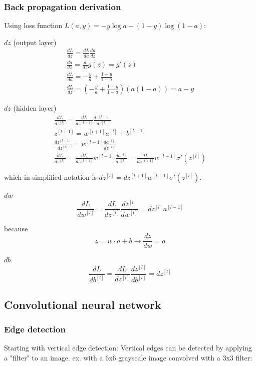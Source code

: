 \documentclass[12pt]{article}
\begin{document}
\subsubsection{Back propagation derivation}

Using loss function $L(a,y) = -y\log a - (1-y)\log (1-a)$:

$dz$ (output layer)
\begin{gather*}
    \frac{dL}{dz} = \frac{dL}{da} \frac{da}{dz}\\
    \frac{da}{dz} = \frac{d}{dz} g(z) = g'(z)\\
    \frac{dL}{da} = -\frac{y}{a} + \frac{1-y}{1-a}\\
    \frac{dL}{dz} = \left(-\frac{y}{a} + \frac{1-y}{1-a}\right)\left(a(1-a)\right) = a - y
\end{gather*}

$dz$ (hidden layer)
\begin{gather*}
    \frac{dL}{dz^{[l]}} = \frac{dL}{dz^{[l+1]}} \frac{dz^{[l+1]}}{dz^{[l]}}\\
    z^{[l+1]} = w^{[l+1]}a^{[l]} + b^{[l+1]}\\
    \frac{dz^{[l+1]}}{dz^{[l]}} = w^{[l+1]}\frac{da^{[l]}}{dz^{[l]}}\\
    \frac{dL}{dz^{[l]}} = \frac{dL}{dz^{[l+1]}} w^{[l+1]} \frac{da^{[l]}}{dz^{[l]}} =
    \frac{dL}{dz^{[l+1]}} w^{[l+1]} \sigma'(z^{[l]})
\end{gather*}

which in simplified notation is $dz^{[l]} = dz^{[l+1]} w^{[l+1]} \sigma'(z^{[l]})$.

$dw$
\[ \frac{dL}{dw^{[l]}} = \frac{dL}{dz^{[l]}} \frac{dz^{[l]}}{dw^{[l]}} = dz^{[l]} a^{[l-1]} \]

because
\[ z = w \cdot a + b \rightarrow \frac{dz}{dw} = a \]

$db$
\[ \frac{dL}{db^{[l]}} = \frac{dL}{dz^{[l]}} \frac{dz^{[l]}}{db^{[l]}} = dz^{[l]} \]

\subsection{Convolutional neural network}

\subsubsection{Edge detection}

Starting with vertical edge detection: Vertical edges can be detected by applying
a "filter" to an image. ex. with a 6x6 grayscale image convolved with a 3x3 filter:
\end{document}
